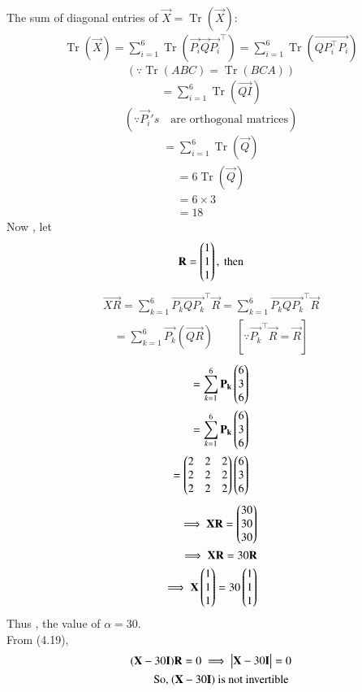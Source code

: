 \documentclass[journal]{IEEEtran}
\begin{document}
The sum of diagonal entries of $\vec{X} = \operatorname{Tr}(\vec{X})$:
\begin{align}
\operatorname{Tr}(\vec{X}) = \sum_{i=1}^6 \operatorname{Tr}(\vec{P_i} \vec{Q} \vec{P_i}^\top) = \sum_{i=1}^6 \operatorname{Tr}(\vec{QP_i^\top P_i})
\end{align}
$$
(\because \operatorname{Tr}(ABC) = \operatorname{Tr}(BCA))
$$
\begin{align}
= \sum_{i=1}^6 \operatorname{Tr}(\vec{Q I})
\end{align}
$$
(\because \vec{P_i}'s \quad  \text{are orthogonal matrices})
$$
\begin{align}
= \sum_{i=1}^6 \operatorname{Tr}(\vec{Q})
\end{align}
\begin{align}
= 6\operatorname{Tr}(\vec{Q})\\
= 6\times 3 \\
=18 \quad \
\end{align}
Now , let
\begin{align}
\mathbf{R} = \begin{pmatrix}1\\1\\1\end{pmatrix}, \text{ then}
\end{align}
\begin{align}
\vec{XR} = \sum_{k=1}^{6} \vec{P_k Q P_k}^\top \vec{R} = \sum_{k=1}^{6} \vec{P_k Q P_k}^\top \vec{R}
\end{align}
\begin{align}
= \sum_{k=1}^{6} \vec{P_k} ( \vec{Q R}) \qquad [\because \vec{P_k}^\top \vec{R} = \vec{R}]
\end{align}
\begin{align}
= \sum_{k=1}^{6} \mathbf{P_k} \begin{pmatrix}6\\3\\6\end{pmatrix}\\
= \sum_{k=1}^{6} \mathbf{P_k} \begin{pmatrix}6\\3\\6\end{pmatrix}\\
= \begin{pmatrix}2 & 2 & 2\\2 & 2 & 2\\2 & 2 & 2\end{pmatrix}\begin{pmatrix}6\\3\\6\end{pmatrix}
\end{align}
\begin{align}
\implies \mathbf{XR} = 
\begin{pmatrix}30\\30\\30\end{pmatrix}\\
\implies \mathbf{XR} = 30\mathbf{R}\\
\implies \mathbf{X}\begin{pmatrix}1\\1\\1\end{pmatrix} = 30\begin{pmatrix}1\\1\\1\end{pmatrix}
\end{align}
Thus , the value of $ \alpha = 30$.\\
From (4.19),
\begin{align}
 (\mathbf{X} - 30\mathbf{I})\mathbf{R} = 0 \implies \begin{vmatrix}\mathbf{X}-30\mathbf{I}\end{vmatrix} = 0 \\
\text{So, } (\mathbf{X} - 30\mathbf{I}) \text{ is not invertible }
\end{align}
\end{document}
